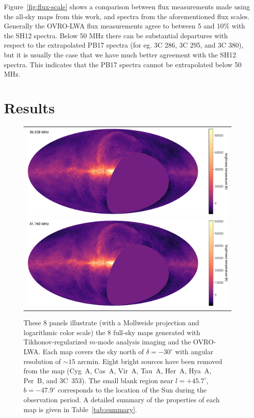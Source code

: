 \documentclass[twocolumn]{aastex61}
\begin{document}
Figure~\ref{fig:flux-scale} shows a comparison between flux measurements made using the all-sky maps
from this work, and spectra from the aforementioned flux scales. Generally the OVRO-LWA flux
measurements agree to between 5 and 10\% with the SH12 spectra. Below 50 MHz there can be
substantial departures with respect to the extrapolated PB17 spectra (for eg.  3C 286, 3C 295, and
3C 380), but it is usually the case that we have much better agreement with the SH12 spectra. This
indicates that the PB17 spectra cannot be extrapolated below 50 MHz.

\section{Results}\label{sec:results}

\begin{figure}[ht]
    \centering
    \begin{tabular}{c}
        \includegraphics[height=0.32\textheight]{figures/channel-maps/spw04} \\
        \includegraphics[height=0.32\textheight]{figures/channel-maps/spw06} \\
    \end{tabular}
    \caption{
        These 8 panels illustrate (with a Mollweide projection and logarithmic color scale) the 8
        full-sky maps generated with Tikhonov-regularized $m$-mode analysis imaging and the
        OVRO-LWA.  Each map covers the sky north of $\delta=-30^\circ$ with angular resolution of
        $\sim15$ arcmin. Eight bright sources have been removed from the map (Cyg~A, Cas~A, Vir~A,
        Tau~A, Her~A, Hya~A, Per~B, and 3C~353). The small blank region near $l=+45.7^\circ$,
        $b=-47.9^\circ$ corresponds to the location of the Sun during the observation period.  A
        detailed summary of the properties of each map is given in Table~\ref{tab:summary}.
    }
    \label{fig:channel-maps}
\end{figure}
\end{document}
